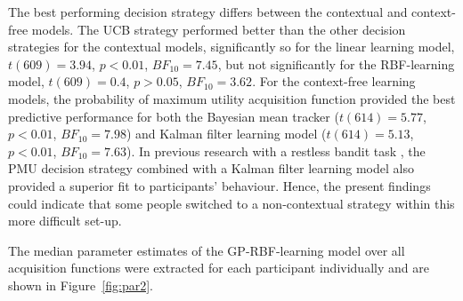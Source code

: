 \documentclass[a4paper,natbib]{apa6}
\begin{document}
The best performing decision strategy differs between the contextual and context-free models. The UCB strategy performed better than the other decision strategies for the contextual models, significantly so for the linear learning model, $t(609)=3.94$, $p<0.01$, $BF_{10}=7.45$, but not significantly for the RBF-learning model, $t(609)=0.4$, $p>0.05$, $BF_{10}=3.62$. For the context-free learning models, the probability of maximum utility acquisition function provided the best predictive performance for both the Bayesian mean tracker ($t(614)=5.77$, $p<0.01$, $BF_{10}= 7.98$) and Kalman filter learning model ($t(614)= 5.13$, $p<0.01$, $BF_{10}= 7.63$). In previous research with a restless bandit task \citep{speekenbrinkuncertainty}, the PMU decision strategy combined with a Kalman filter learning model also provided a superior fit to participants' behaviour. Hence, the present findings could indicate that some people switched to a non-contextual strategy within this more difficult set-up. 

The median parameter estimates of the GP-RBF-learning model over all acquisition functions were extracted for each participant individually and are shown in Figure~\ref{fig:par2}.
\end{document}
